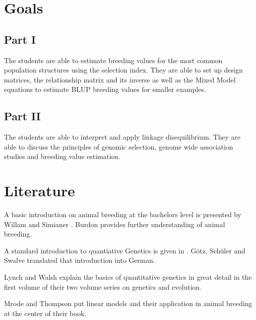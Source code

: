 \documentclass{article}
\begin{document}
\section*{Goals}
\subsection*{Part I}
The students are able to estimate breeding values for the most common population structures using the selection index. They are able to set up design matrices, the relationship matrix and its inverse as well as the Mixed Model equations to estimate BLUP breeding values for smaller examples.

\subsection*{Part II}
The students are able to interpret and apply linkage disequilibrium. They are able to discuss the principles of genomic selection, genome wide association studies and breeding value estimation.

\section*{Literature}
A basic introduction on animal breeding at the bachelors level is presented by Willam and Simianer \cite{Willam2011}. Burdon \cite{Bourdon1999} provides further understanding of animal breeding.

A standard introduction to quantiative Genetics is given in \cite{Falconer1996}. G\"otz, Sch\"uler and Swalve \cite{GSS2002} translated that introduction into German.

Lynch and Walsh \cite{Lynch1998} explain the basics of quantitative genetics in great detail in the first volume of their two volume series on genetics and evolution.


Mrode and Thompson \cite{Mrode2005} put linear models and their application in animal breeding at the center of their book.



\end{document}

